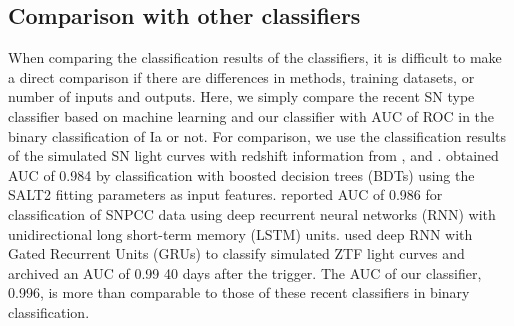 \documentclass[proof]{pasj01}
\begin{document}
\subsection{Comparison with other classifiers}
%
When comparing the classification results of the classifiers, it is difficult to make a direct comparison if there are differences in methods, training datasets, or number of inputs and outputs. 
Here, we simply compare the recent SN type classifier based on machine learning and our classifier with AUC of ROC in the binary classification of Ia or not.
For comparison, we use the classification results of the simulated SN light curves with redshift information from \citet{Lochner_2016}, \citet{charnock17a} and \citet{Muthukrishna_2019}.
\citet{Lochner_2016} obtained AUC of 0.984 by classification with boosted decision trees (BDTs) using the SALT2 fitting parameters as input features.
\citet{charnock17a} reported AUC of 0.986 for classification of SNPCC data using deep recurrent neural networks (RNN) with unidirectional long short-term memory (LSTM) units.
\citet{Muthukrishna_2019} used deep RNN with Gated Recurrent Units (GRUs) to classify simulated ZTF light curves and archived an AUC of 0.99 40 days after the trigger.
The AUC of our classifier, 0.996, is more than comparable to those of these recent classifiers in binary classification.
\end{document}
